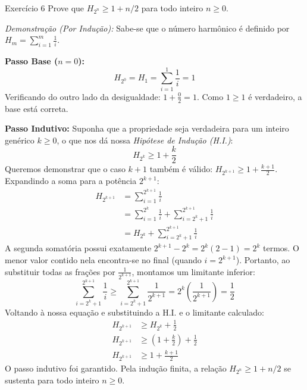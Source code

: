 \documentclass[a4paper,11pt]{article}
\theoremstyle{definition}
\theoremstyle{plain}
\theoremstyle{remark}
\newcounter{questao}[section]
\begin{document}
\newpage \begin{questaoManually}{Exercício 6}
Prove que $H_{2^n} \ge 1 + n/2$ para todo inteiro $n \ge 0$.

\textit{Demonstração (Por Indução):}
Sabe-se que o número harmônico é definido por $H_m = \sum_{i=1}^m \frac{1}{i}$.

\textbf{Passo Base ($n=0$):}
\begin{equation}
H_{2^0} = H_1 = \sum_{i=1}^1 \frac{1}{i} = 1
\end{equation}
Verificando do outro lado da desigualdade: $1 + \frac{0}{2} = 1$.
Como $1 \ge 1$ é verdadeiro, a base está correta.

\textbf{Passo Indutivo:}
Suponha que a propriedade seja verdadeira para um inteiro genérico $k \ge 0$, o que nos dá nossa \textit{Hipótese de Indução (H.I.)}:
\begin{equation}
H_{2^k} \ge 1 + \frac{k}{2}
\end{equation}
Queremos demonstrar que o caso $k+1$ também é válido: $H_{2^{k+1}} \ge 1 + \frac{k+1}{2}$.
Expandindo a soma para a potência $2^{k+1}$:
\begin{align*}
H_{2^{k+1}} &= \sum_{i=1}^{2^{k+1}} \frac{1}{i} \\
&= \sum_{i=1}^{2^k} \frac{1}{i} + \sum_{i=2^k+1}^{2^{k+1}} \frac{1}{i} \\
&= H_{2^k} + \sum_{i=2^k+1}^{2^{k+1}} \frac{1}{i}
\end{align*}
A segunda somatória possui exatamente $2^{k+1} - 2^k = 2^k(2 - 1) = 2^k$ termos. O menor valor contido nela encontra-se no final (quando $i = 2^{k+1}$). Portanto, ao substituir todas as frações por $\frac{1}{2^{k+1}}$, montamos um limitante inferior:
\begin{equation}
\sum_{i=2^k+1}^{2^{k+1}} \frac{1}{i} \ge \sum_{i=2^k+1}^{2^{k+1}} \frac{1}{2^{k+1}} = 2^k \left( \frac{1}{2^{k+1}} \right) = \frac{1}{2}
\end{equation}
Voltando à nossa equação e substituindo a H.I. e o limitante calculado:
\begin{align*}
H_{2^{k+1}} &\ge H_{2^k} + \frac{1}{2} \\
H_{2^{k+1}} &\ge \left( 1 + \frac{k}{2} \right) + \frac{1}{2} \\
H_{2^{k+1}} &\ge 1 + \frac{k+1}{2}
\end{align*}
O passo indutivo foi garantido. Pela indução finita, a relação $H_{2^n} \ge 1 + n/2$ se sustenta para todo inteiro $n \ge 0$. \blacksquare

\end{questaoManually}
\end{document}
